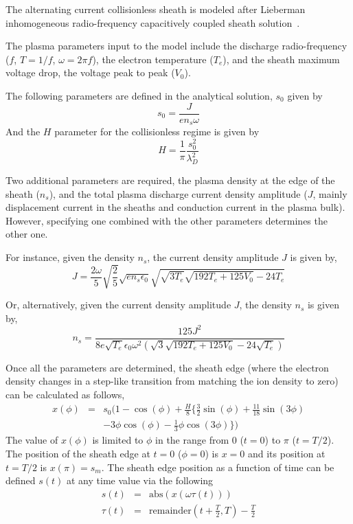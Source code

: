 The alternating current collisionless sheath is modeled after Lieberman inhomogeneous radio-frequency capacitively coupled sheath solution~\cite{Lieberman1988}. 

The plasma parameters input to the model include the discharge radio-frequency ($f$, $T=1/f$, $\omega = 2 \pi f$), the electron temperature ($T_e$), and the sheath maximum voltage drop, the voltage peak to peak ($V_0$).

The following parameters are defined in the analytical solution, $s_0$ given by 
\begin{equation}
s_0 = \frac{J}{e n_s \omega}
\end{equation}
And the $H$ parameter for the collisionless regime is given by
\begin{equation}
H = \frac1{\pi} \frac{s_0^2}{\lambda_D^2}
\end{equation}

Two additional parameters are required, the plasma density at the edge of the sheath ($n_s$), and the total plasma discharge current density amplitude ($J$, mainly displacement current in the sheaths and conduction current in the plasma bulk). However, specifying one combined with the other parameters determines the other one. 

For instance, given the density $n_s$, the current density amplitude $J$ is given by, 
\begin{equation}
J = \frac{2 \omega}{5} \sqrt{\frac25} \sqrt{e n_s \epsilon_0} \sqrt{ \sqrt{3 T_e} \sqrt{192 T_e + 125 V_0} -24 T_e    }
\end{equation}

Or, alternatively, given the current density amplitude $J$, the density $n_s$ is given by, 
\begin{equation}
n_s = \frac{125 J^2}{ 8 e \sqrt{T_e} \epsilon_0 \omega^2 (\sqrt{3}\sqrt{192 T_e + 125 V_0}-24 \sqrt{T_e})  }
\end{equation}

Once all the parameters are determined, the sheath edge (where the electron density changes in a step-like transition from matching the ion density to zero) can be calculated as follows, 
\begin{eqnarray}\label{eq:CollisionlessSheathEdge}
x(\phi) &=& s_0 ( 1 - \cos(\phi) + \frac{H}{8} \{ \frac32 \sin(\phi)  + \frac{11}{18} \sin(3 \phi) \nonumber \\ 
        & & - 3 \phi \cos(\phi)  - \frac13 \phi \cos(3 \phi)  \} )
\end{eqnarray}
The value of $x(\phi)$ is limited to $\phi$ in the range from 0 ($t=0$) to $\pi$ ($t=T/2$). The position of the sheath edge at $t=0$ ($\phi = 0$) is $x=0$ and its position at $t=T/2$  is $x(\pi) = s_m$. The sheath edge position as a function of time can be defined $s(t)$ at any time value via the following 
\begin{eqnarray}
s(t)    &=& \text{abs}(x(\omega \tau(t))) \\
\tau(t) &=& \text{remainder}\left(t+\frac{T}{2},T\right) - \frac{T}{2} 
\end{eqnarray}

